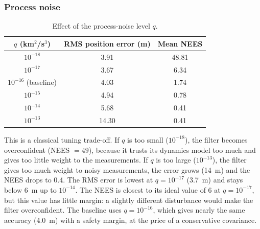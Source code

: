 \documentclass[11pt,a4paper]{article}
\begin{document}
\subsubsection{Process noise}
\label{sec:qstudy}
\begin{table}[H]
\centering
\caption{Effect of the process-noise level $q$.}
\label{tab:q}
\begin{tabular}{ccc}
\toprule
$q$ (km$^2$/s$^3$) & \textbf{RMS position error (m)} & \textbf{Mean NEES} \\
\midrule
$10^{-18}$ & 3.91 & 48.81 \\
$10^{-17}$ & 3.67 & 6.34 \\
$10^{-16}$ (baseline) & 4.03 & 1.74 \\
$10^{-15}$ & 4.94 & 0.78 \\
$10^{-14}$ & 5.68 & 0.41 \\
$10^{-13}$ & 14.30 & 0.41 \\
\bottomrule
\end{tabular}
\end{table}
This is a classical tuning trade-off. If $q$ is too small ($10^{-18}$), the filter becomes overconfident (NEES $=49$), because it trusts its dynamics model too much and gives too little weight to the measurements. If $q$ is too large ($10^{-13}$), the filter gives too much weight to noisy measurements, the error grows (14~m) and the NEES drops to 0.4. The RMS error is lowest at $q=10^{-17}$ (3.7~m) and stays below 6~m up to $10^{-14}$.
The NEES is closest to its ideal value of 6 at $q=10^{-17}$, but this value has little margin: a slightly different disturbance would make the filter overconfident. The baseline uses $q=10^{-16}$, which gives nearly the same accuracy (4.0~m) with a safety margin, at the price of a conservative covariance.
\end{document}
